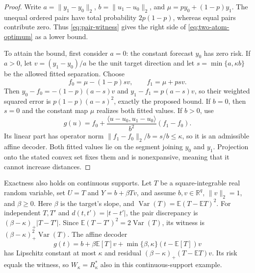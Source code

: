 \begin{proof}
Write $a=\|y_1-y_0\|_2$, $b=\|u_1-u_0\|_2$, and
$\mu=py_0+(1-p)y_1$. The unequal ordered pairs have total probability
$2p(1-p)$, whereas equal pairs contribute zero. Thus
\eqref{eq:pair-witness} gives the right side of
\eqref{eq:two-atom-optimum} as a lower bound.

To attain the bound, first consider $a=0$: the constant forecast $y_0$
has zero risk. If $a>0$, let $v=(y_1-y_0)/a$ be the unit target direction
and let $s=\min\{a,\kappa b\}$ be the allowed fitted separation. Choose
\[
 f_0=\mu-(1-p)sv,\qquad f_1=\mu+psv.
\]
Then $y_0-f_0=-(1-p)(a-s)v$ and
$y_1-f_1=p(a-s)v$, so their weighted squared error is
$p(1-p)(a-s)^2$, exactly the proposed bound. If $b=0$, then $s=0$
and the constant map $\mu$ realizes both fitted values. If $b>0$, use
\[
 g(u)=f_0+
 \frac{\langle u-u_0,u_1-u_0\rangle}{b^2}(f_1-f_0).
\]
Its linear part has operator norm $\|f_1-f_0\|_2/b=s/b\leq\kappa$,
so it is an admissible affine decoder. Both fitted values lie on the
segment joining $y_0$ and $y_1$. Projection onto the stated convex set
fixes them and is nonexpansive, meaning that it cannot increase distances.
\end{proof}

Exactness also holds on continuous supports. Let $T$ be a square-integrable
real random variable, set $U=T$ and $Y=b+\beta Tv$, and assume
$b,v\in\mathbb R^q$, $\|v\|_2=1$, and $\beta\geq0$.
Here $\beta$ is the target's slope, and
$\operatorname{Var}(T)=\mathbb E(T-\mathbb ET)^2$.
For independent $T,T'$ and $d(t,t')=|t-t'|$, the pair discrepancy is
$(\beta-\kappa)_+|T-T'|$. Since
$\mathbb E(T-T')^2=2\operatorname{Var}(T)$, its witness is
$(\beta-\kappa)_+^2\operatorname{Var}(T)$. The affine decoder
\[
 g(t)=b+\beta\mathbb E[T]v+
       \min\{\beta,\kappa\}(t-\mathbb E[T])v
\]
has Lipschitz constant at most $\kappa$ and residual
$(\beta-\kappa)_+(T-\mathbb ET)v$. Its risk equals the witness, so
$W_\kappa=R^*_\kappa$ also in this continuous-support example.

